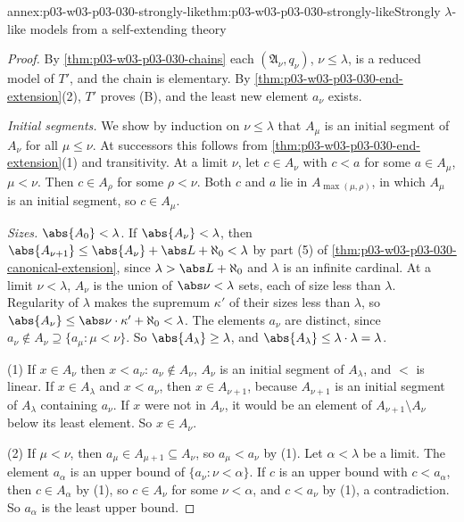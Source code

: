 \begin{annexitem}{annex:p03-w03-p03-030-strongly-like}{thm:p03-w03-p03-030-strongly-like}{Strongly \(\lambda\)-like models from a self-extending theory}
\begin{proof}
By \cref{thm:p03-w03-p03-030-chains} each \((\mathfrak A_\nu,q_\nu)\),
\(\nu\le\lambda\), is a reduced model of \(T'\), and the chain is elementary.
By \cref{thm:p03-w03-p03-030-end-extension}(2), \(T'\) proves (B), and the
least new element \(a_\nu\) exists.

\emph{Initial segments.}  We show by induction on \(\nu\le\lambda\) that
\(A_\mu\) is an initial segment of \(A_\nu\) for all \(\mu\le\nu\).  At
successors this follows from \cref{thm:p03-w03-p03-030-end-extension}(1) and
transitivity.  At a limit \(\nu\), let \(c\in A_\nu\) with \(c<a\) for some
\(a\in A_\mu\), \(\mu<\nu\).  Then \(c\in A_\rho\) for some \(\rho<\nu\).
Both \(c\) and \(a\) lie in \(A_{\max(\mu,\rho)}\), in which \(A_\mu\) is an
initial segment, so \(c\in A_\mu\).

\emph{Sizes.}  \(\abs{A_0}<\lambda\).  If \(\abs{A_\nu}<\lambda\), then
\(\abs{A_{\nu+1}}\le\abs{A_\nu}+\abs L+\aleph_0<\lambda\) by part (5) of
\cref{thm:p03-w03-p03-030-canonical-extension}, since
\(\lambda>\abs L+\aleph_0\) and \(\lambda\) is an infinite cardinal.  At a
limit \(\nu<\lambda\), \(A_\nu\) is the union of \(\abs\nu<\lambda\) sets,
each of size less than \(\lambda\).  Regularity of \(\lambda\) makes the
supremum \(\kappa'\) of their sizes less than \(\lambda\), so
\(\abs{A_\nu}\le\abs\nu\cdot\kappa'+\aleph_0<\lambda\).  The elements \(a_\nu\)
are distinct, since \(a_\nu\notin A_\nu\supseteq\{a_\mu:\mu<\nu\}\).  So
\(\abs{A_\lambda}\ge\lambda\), and \(\abs{A_\lambda}\le\lambda\cdot\lambda=
\lambda\).

(1) If \(x\in A_\nu\) then \(x<a_\nu\): \(a_\nu\notin A_\nu\), \(A_\nu\) is an
initial segment of \(A_\lambda\), and \(<\) is linear.  If \(x\in A_\lambda\)
and \(x<a_\nu\), then \(x\in A_{\nu+1}\), because \(A_{\nu+1}\) is an initial
segment of \(A_\lambda\) containing \(a_\nu\).  If \(x\) were not in
\(A_\nu\), it would be an element of \(A_{\nu+1}\setminus A_\nu\) below its
least element.  So \(x\in A_\nu\).

(2) If \(\mu<\nu\), then \(a_\mu\in A_{\mu+1}\subseteq A_\nu\), so
\(a_\mu<a_\nu\) by (1).  Let \(\alpha<\lambda\) be a limit.  The element
\(a_\alpha\) is an upper bound of \(\{a_\nu:\nu<\alpha\}\).  If \(c\) is an
upper bound with \(c<a_\alpha\), then \(c\in A_\alpha\) by (1), so
\(c\in A_\nu\) for some \(\nu<\alpha\), and \(c<a_\nu\) by (1), a
contradiction.  So \(a_\alpha\) is the least upper bound.


\end{proof}
\end{annexitem}
